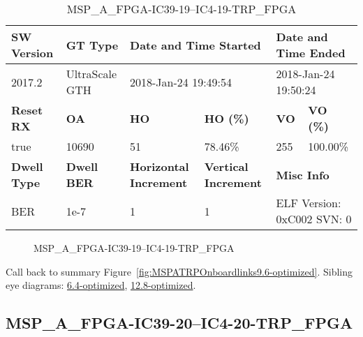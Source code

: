 \begin{table}[h]
\centering
\caption{MSP\_A\_FPGA-IC39-19--IC4-19-TRP\_FPGA}
\label{tab:MSPAFPGAIC3919IC419TRPFPGA9.6-optimized}
\begin{tabular}{@{}|l|l|l|l|l|l|@{}}
\toprule
\textbf{SW Version}                & \textbf{GT Type}   & \multicolumn{2}{l|}{\textbf{Date and Time Started}}            & \multicolumn{2}{l|}{\textbf{Date and Time Ended}}        \\ \midrule
2017.2                       & UltraScale GTH          & \multicolumn{2}{l|}{2018-Jan-24 19:49:54}                   & \multicolumn{2}{l|}{2018-Jan-24 19:50:24}               \\ \midrule
\textbf{Reset RX}                  & \textbf{OA} & \textbf{HO}   & \textbf{HO (\%)} & \textbf{VO} & \textbf{VO (\%)} \\ \midrule
true & 10690        & 51          & 78.46\%        & 255        & 100.00\%       \\ \midrule
\textbf{Dwell Type}                & \textbf{Dwell BER} & \textbf{Horizontal Increment} & \textbf{Vertical Increment}    & \multicolumn{2}{l|}{\textbf{Misc Info}}                  \\ \midrule
BER                            & 1e-7        & 1        & 1           & \multicolumn{2}{l|}{ELF Version: 0xC002 SVN: 0}                         \\ \bottomrule
\end{tabular}
\end{table}

\begin{figure}[h]
\caption{MSP\_A\_FPGA-IC39-19--IC4-19-TRP\_FPGA} \label{fig:MSPAFPGAIC3919IC419TRPFPGA9.6-optimized}
\end{figure}

Call back to summary Figure~\ref{fig:MSPATRPOnboardlinks9.6-optimized}.
Sibling eye diagrams: \hyperref[sec:MSPAFPGAIC3919IC419TRPFPGA6.4-optimized]{6.4-optimized}, \hyperref[sec:MSPAFPGAIC3919IC419TRPFPGA12.8-optimized]{12.8-optimized}.

\clearpage
\newpage


\subsection{MSP\_A\_FPGA-IC39-20--IC4-20-TRP\_FPGA}\label{sec:MSPAFPGAIC3920IC420TRPFPGA9.6-optimized}

